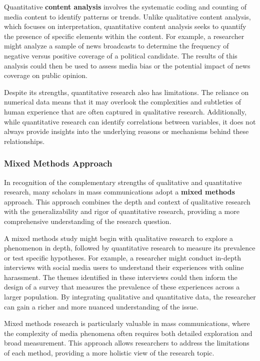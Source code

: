 \documentclass[
]{book}
\begin{document}
Quantitative \textbf{content analysis} involves the systematic coding and counting of media content to identify patterns or trends. Unlike qualitative content analysis, which focuses on interpretation, quantitative content analysis seeks to quantify the presence of specific elements within the content. For example, a researcher might analyze a sample of news broadcasts to determine the frequency of negative versus positive coverage of a political candidate. The results of this analysis could then be used to assess media bias or the potential impact of news coverage on public opinion.

Despite its strengths, quantitative research also has limitations. The reliance on numerical data means that it may overlook the complexities and subtleties of human experience that are often captured in qualitative research. Additionally, while quantitative research can identify correlations between variables, it does not always provide insights into the underlying reasons or mechanisms behind these relationships.

\subsubsection*{Mixed Methods Approach}\label{mixed-methods-approach}

In recognition of the complementary strengths of qualitative and quantitative research, many scholars in mass communications adopt a \textbf{mixed methods} approach. This approach combines the depth and context of qualitative research with the generalizability and rigor of quantitative research, providing a more comprehensive understanding of the research question.

A mixed methods study might begin with qualitative research to explore a phenomenon in depth, followed by quantitative research to measure its prevalence or test specific hypotheses. For example, a researcher might conduct in-depth interviews with social media users to understand their experiences with online harassment. The themes identified in these interviews could then inform the design of a survey that measures the prevalence of these experiences across a larger population. By integrating qualitative and quantitative data, the researcher can gain a richer and more nuanced understanding of the issue.

Mixed methods research is particularly valuable in mass communications, where the complexity of media phenomena often requires both detailed exploration and broad measurement. This approach allows researchers to address the limitations of each method, providing a more holistic view of the research topic.
\end{document}
